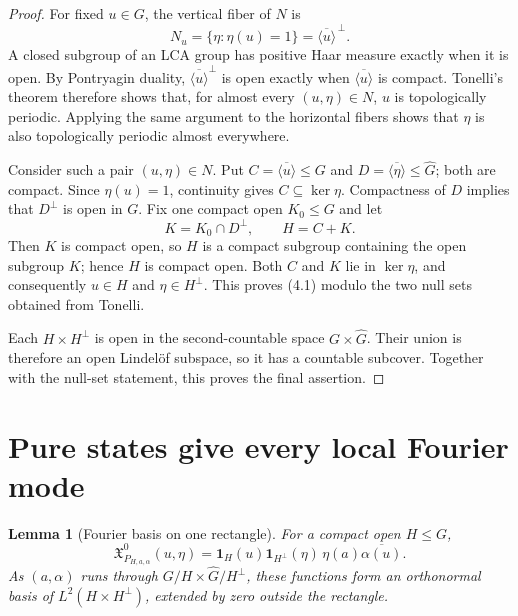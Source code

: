 \documentclass[11pt]{article}
\newtheorem{lemma}[theorem]{Lemma}
\theoremstyle{remark}
\newcommand{\Ghat}{\widehat G}
\newcommand{\X}{\mathfrak X}
\newcommand{\one}{\mathbf 1}
\begin{document}
\begin{proof}
For fixed $u\in G$, the vertical fiber of $N$ is
\[
 N_u=\{\eta:\eta(u)=1\}
     =\overline{\langle u\rangle}^{\,\perp}.
\]
A closed subgroup of an LCA group has positive Haar measure exactly when it
is open.  By Pontryagin duality,
$\overline{\langle u\rangle}^{\perp}$ is open exactly when
$\overline{\langle u\rangle}$ is compact.  Tonelli's theorem therefore shows
that, for almost every $(u,\eta)\in N$, $u$ is topologically periodic.
Applying the same argument to the horizontal fibers shows that $\eta$ is
also topologically periodic almost everywhere.

Consider such a pair $(u,\eta)\in N$.  Put
$C=\overline{\langle u\rangle}\leq G$ and
$D=\overline{\langle\eta\rangle}\leq\Ghat$; both are compact.  Since
$\eta(u)=1$, continuity gives $C\subseteq\ker\eta$.  Compactness of $D$
implies that $D^\perp$ is open in $G$.  Fix one compact open $K_0\leq G$ and
let
\[
 K=K_0\cap D^\perp,\qquad H=C+K.
\]
Then $K$ is compact open, so $H$ is a compact subgroup containing the open
subgroup $K$; hence $H$ is compact open.  Both $C$ and $K$ lie in
$\ker\eta$, and consequently $u\in H$ and $\eta\in H^\perp$.  This proves
(4.1) modulo the two null sets obtained from Tonelli.

Each $H\times H^\perp$ is open in the second-countable space
$G\times\Ghat$.  Their union is therefore an open Lindel\"of subspace, so it
has a countable subcover.  Together with the null-set statement, this proves
the final assertion.
\end{proof}

\section{Pure states give every local Fourier mode}

\begin{lemma}[Fourier basis on one rectangle]\label{lem:local}
For a compact open $H\leq G$,
\[
 \X^0_{P_{H,a,\alpha}}(u,\eta)
 =\one_H(u)\one_{H^\perp}(\eta)\,
   \eta(a)\overline{\alpha(u)}.                              \tag{5.1}
\]
As $(a,\alpha)$ runs through
$G/H\times\Ghat/H^\perp$, these functions form an orthonormal basis of
$L^2(H\times H^\perp)$, extended by zero outside the rectangle.
\end{lemma}
\end{document}
